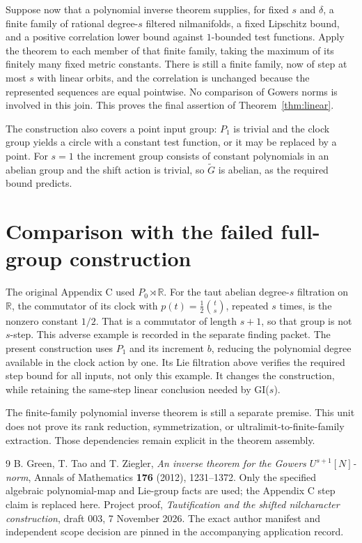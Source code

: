\documentclass[11pt]{article}
\newcommand{\R}{\mathbb R}
\begin{document}
Suppose now that a polynomial inverse theorem supplies, for fixed $s$ and
$\delta$, a finite family of rational degree-$s$ filtered nilmanifolds,
a fixed Lipschitz bound, and a positive correlation lower bound against
$1$-bounded test functions. Apply the theorem to each member of that finite
family, taking the maximum of its finitely many fixed metric constants.
There is still a finite family, now of step at most $s$ with linear orbits,
and the correlation is unchanged because the represented sequences are
equal pointwise. No comparison of Gowers norms is involved in this join.
This proves the final assertion of Theorem~\ref{thm:linear}.

The construction also covers a point input group: $P_1$ is trivial and the
clock group yields a circle with a constant test function, or it may be
replaced by a point. For $s=1$ the increment group consists of constant
polynomials in an abelian group and the shift action is trivial, so
$\widetilde G$ is abelian, as the required bound predicts.

\section{Comparison with the failed full-group construction}

The original Appendix C used $P_0\rtimes\R$. For the taut abelian
degree-$s$ filtration on $\R$, the commutator of its clock with
$p(t)=\tfrac12\binom ts$, repeated $s$ times, is the nonzero constant
$1/2$. That is a commutator of length $s+1$, so that group is not
$s$-step. This adverse example is recorded in the separate finding packet.
The present construction uses $P_1$ and its increment $b$, reducing
the polynomial degree available in the clock action by one. Its Lie
filtration above verifies the required step bound for all inputs, not
only this example. It changes the construction, while retaining the
same-step linear conclusion needed by GI($s$).

The finite-family polynomial inverse theorem is still a separate premise.
This unit does not prove its rank reduction, symmetrization, or
ultralimit-to-finite-family extraction. Those dependencies remain explicit
in the theorem assembly.

\begin{thebibliography}{9}
 B. Green, T. Tao and T. Ziegler,
\emph{An inverse theorem for the Gowers $U^{s+1}[N]$-norm},
Annals of Mathematics \textbf{176} (2012), 1231--1372.
Only the specified algebraic polynomial-map and Lie-group facts are used;
the Appendix C step claim is replaced here.
 Project proof, \emph{Tautification and the shifted
nilcharacter construction}, draft 003, 7 November 2026.
The exact author manifest and independent scope decision are pinned in
the accompanying application record.
\end{thebibliography}
\end{document}
